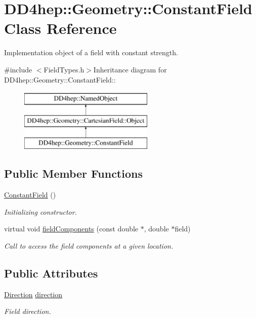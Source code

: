 \hypertarget{class_d_d4hep_1_1_geometry_1_1_constant_field}{
\section{DD4hep::Geometry::ConstantField Class Reference}
\label{class_d_d4hep_1_1_geometry_1_1_constant_field}
}


Implementation object of a field with constant strength.  


{\ttfamily \#include $<$FieldTypes.h$>$}Inheritance diagram for DD4hep::Geometry::ConstantField::\begin{figure}[H]
\begin{center}
\leavevmode
\includegraphics[height=3cm]{class_d_d4hep_1_1_geometry_1_1_constant_field}
\end{center}
\end{figure}
\subsection*{Public Member Functions}
\begin{DoxyCompactItemize}
\item 
\hyperlink{class_d_d4hep_1_1_geometry_1_1_constant_field_a2fb76b37024098548c0a190666c8d30a}{ConstantField} ()
\begin{DoxyCompactList}\small\item\em Initializing constructor. \item\end{DoxyCompactList}\item 
virtual void \hyperlink{class_d_d4hep_1_1_geometry_1_1_constant_field_a512fc8911c0c3e710b363c455c2c9ea9}{fieldComponents} (const double $\ast$, double $\ast$field)
\begin{DoxyCompactList}\small\item\em Call to access the field components at a given location. \item\end{DoxyCompactList}\end{DoxyCompactItemize}
\subsection*{Public Attributes}
\begin{DoxyCompactItemize}
\item 
\hyperlink{namespace_d_d4hep_1_1_geometry_a56730a0ddb9f3f089c415cd693bd7c19}{Direction} \hyperlink{class_d_d4hep_1_1_geometry_1_1_constant_field_a986d167280511c4650ffa950188cdef7}{direction}
\begin{DoxyCompactList}\small\item\em Field direction. \item\end{DoxyCompactList}\end{DoxyCompactItemize}


